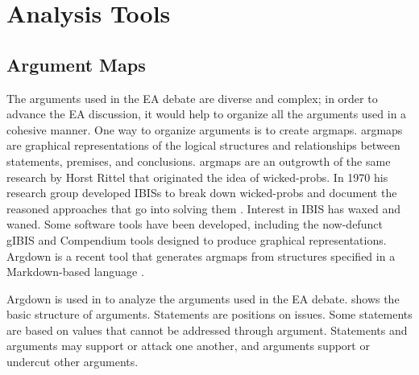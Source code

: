 \chapter{Analysis Tools}
\label{chap-tools}






\section{Argument Maps}
\label{sec-arg-maps-intro}

The arguments used in the \ac{EA} debate are diverse and complex; in order to advance the \ac{EA} discussion, it would
help to organize all the arguments used in a cohesive manner. One way to organize arguments is to create \acp{argmap}.
\Acp{argmap} are graphical representations of the logical structures and relationships between statements, premises, and
conclusions. \Acp{argmap} are an outgrowth of the same research by Horst Rittel that originated the idea of
\acp{wicked-prob}. In 1970 his research group developed \acp{IBIS} to break down \acp{wicked-prob} and document the
reasoned approaches that go into solving them \cite{kunz_issues_1970}. Interest in \ac{IBIS} has waxed and waned. Some
software tools have been developed, including the now-defunct gIBIS \cite{conklin_gibis_1988} and Compendium
\cite{dutoit_hypermedia_2006} tools designed to produce graphical representations. Argdown is a recent tool that
generates \acp{argmap} from structures specified in a Markdown-based language \cite{voigt_argdown_2018}.

Argdown is used in  to analyze the arguments used in the \ac{EA} debate. 
shows the basic structure of arguments. Statements are positions on issues. Some statements are based on values that
cannot be addressed through argument. Statements and arguments may support or attack one another, and arguments support
or undercut other arguments.

